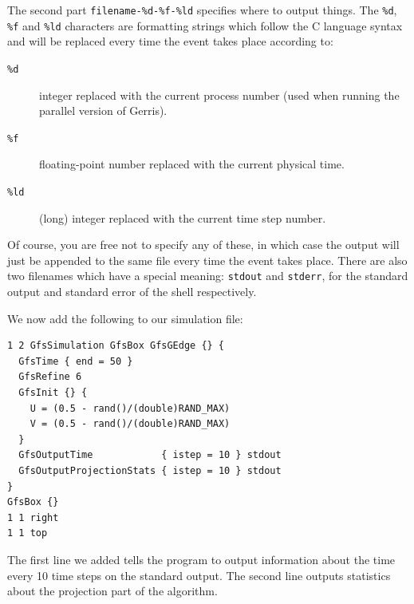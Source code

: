 \documentclass[a4paper]{article}
\begin{document}
The second part {\tt filename-\%d-\%f-\%ld} specifies where to output
things. The {\tt \%d}, {\tt \%f} and {\tt \%ld} characters are
formatting strings which follow the C language syntax and will be
replaced every time the event takes place according to:
\begin{description}
\item[{\tt \%d}] integer replaced with the current process number (used when
running the parallel version of Gerris).
\item[{\tt \%f}] floating-point number replaced with the current
physical time.
\item[{\tt \%ld}] (long) integer replaced with the current time step number.
\end{description}
Of course, you are free not to specify any of these, in which case the 
output will just be appended to the same file every time the event
takes place. There are also two filenames which have a special
meaning: {\tt stdout} and {\tt stderr}, for the standard output and
standard error of the shell respectively.

We now add the following to our simulation file:
\begin{verbatim}
1 2 GfsSimulation GfsBox GfsGEdge {} {
  GfsTime { end = 50 }
  GfsRefine 6
  GfsInit {} {
    U = (0.5 - rand()/(double)RAND_MAX)
    V = (0.5 - rand()/(double)RAND_MAX)
  }  
  GfsOutputTime            { istep = 10 } stdout
  GfsOutputProjectionStats { istep = 10 } stdout
}
GfsBox {}
1 1 right
1 1 top
\end{verbatim}
The first line we added tells the program to output information about
the time every 10 time steps on the standard output. The second line
outputs statistics about the projection part of the algorithm.
\end{document}

